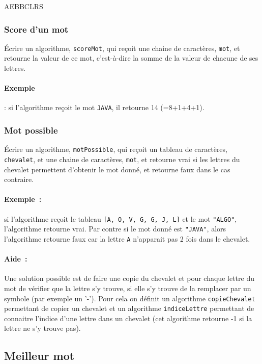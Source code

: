 \begin{Exercice}{AEBBCLRS}
		\subsubsection*{Score d’un mot}
			
			Écrire un algorithme, \texttt{scoreMot}, qui reçoit une chaine de
			caractères, \texttt{mot}, et retourne la valeur de ce mot,
			c’est-à-dire la somme de la valeur de chacune de ses lettres.
	
			\paragraph{Exemple}: si l’algorithme reçoit le mot \texttt{JAVA}, il
			retourne 14 (=8+1+4+1).
	
		\subsubsection*{Mot possible}
	
			Écrire un algorithme, \texttt{motPossible}, qui reçoit un tableau de
			caractères, \texttt{chevalet}, et une chaine de caractères,
			\texttt{mot}, et retourne vrai si les lettres du chevalet permettent
			d’obtenir le mot donné, et retourne faux dans le cas contraire. 
	
	
			\paragraph{Exemple~:} si l’algorithme reçoit le tableau \texttt{[A,
			O, V, G, G, J, L]} et le mot \texttt{"ALGO"}, l’algorithme retourne
			vrai.  Par contre si le mot donné est \texttt{"JAVA"}, alors
			l’algorithme retourne faux car la lettre \texttt{A} n’apparait pas
			2 fois dans le chevalet.
	
	
			\paragraph{Aide~:} Une solution possible est de faire une copie du
			chevalet et pour chaque lettre du mot de vérifier que la lettre s’y
			trouve, si elle s’y trouve de la remplacer par un symbole (par
			exemple un '-').  Pour cela on définit un algorithme
			\texttt{copieChevalet} permettant de copier un chevalet et un
			algorithme \texttt{indiceLettre} permettant de connaitre l’indice
			d’une lettre dans un chevalet (cet algorithme retourne -1 si la
			lettre ne s’y trouve pas). 
	
		\subsection*{Meilleur mot}
	

\end{Exercice}
